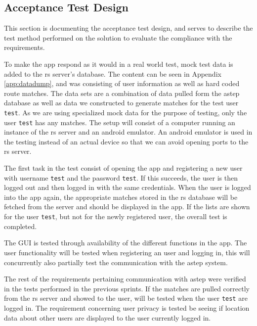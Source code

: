 \subsection{Acceptance Test Design}
This section is documenting the acceptance test design, and serves to describe the test method performed on the solution to evaluate the compliance with the requirements.

To make the app respond as it would in a real world test, mock test data is added to the \gls{rs} server's database. 
The content can be seen in Appendix \ref{app:datadump}, and was consisting of user information as well as hard coded route matches.
The data sets are a combination of data pulled form the \gls{astep} database as well as data we constructed to generate matches for the test user \texttt{test}.
As we are using specialized mock data for the purpose of testing, only the user \texttt{test} has any matches.
The setup will consist of a computer running an instance of the \gls{rs} server and an android emulator.
An android emulator is used in the testing instead of an actual device so that we can avoid opening ports to the \gls{rs} server.

The first task in the test consist of opening the app and registering a new user with username \texttt{test} and the password \texttt{test}.
If this succeeds, the user is then logged out and then logged in with the same credentials.
When the user is logged into the app again, the appropriate matches stored in the \gls{rs} database will be fetched from the server and should be displayed in the app.
If the lists are shown for the user \texttt{test}, but not for the newly registered user, the overall test is completed. 

The GUI is tested through availability of the different functions in the app.
The user functionality will be tested when registering an user and logging in, this will concurrently also partially test the communication with the \gls{astep} system.

The rest of the requirements pertaining communication with \gls{astep} were verified in the tests performed in the previous sprints.
If the matches are pulled correctly from the \gls{rs} server and showed to the user, will be tested when the user \texttt{test} are logged in.
The requirement concerning user privacy is tested be seeing if location data about other users are displayed to the user currently logged in. 


